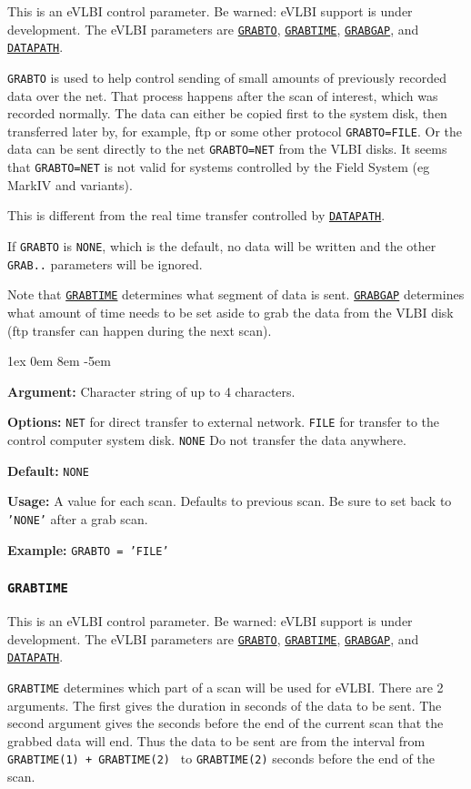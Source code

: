 \documentclass{report}
\newcommand{\rcwbox}[5]{
  \begin{list}{}{\parsep 1ex  \itemsep 0em
                 \leftmargin 8em  \itemindent -5em }
    \item {\bf Argument:} #1
    \item {\bf Options:}  #2
    \item {\bf Default:}  #3
    \item {\bf Usage:}    #4
    \item {\bf Example:}  #5
  \end{list}
}
\begin{document}
This is an eVLBI control parameter.  Be warned: eVLBI support is
under development.
The eVLBI parameters are 
{\hyperref[MP:GRABTO]{{\tt GRABTO}}},
{\hyperref[MP:GRABTIME]{{\tt GRABTIME}}}, 
{\hyperref[MP:GRABGAP]{{\tt GRABGAP}}},
and 
{\hyperref[MP:DATAPATH]{{\tt DATAPATH}}}.

{\tt GRABTO} is used to help control sending of small amounts of
previously recorded data over the net.  That process happens after the
scan of interest, which was recorded normally.  The data can either be
copied first to the system disk, then transferred later by, for
example, ftp or some other protocol {\tt GRABTO=FILE}.  Or the data
can be sent directly to the net {\tt GRABTO=NET} from the VLBI disks.
It seems that {\tt GRABTO=NET} is not valid for systems controlled by
the Field System (eg MarkIV and variants).

This is different from the real time transfer controlled by
{\hyperref[MP:DATAPATH]{{\tt DATAPATH}}}.

If {\tt GRABTO} is {\tt NONE}, which is the default, no data will be
written and the other {\tt GRAB..} parameters will be ignored.

Note that 
{\hyperref[MP:GRABTIME]{{\tt GRABTIME}}} determines what
segment of data is sent.  
{\hyperref[MP:GRABGAP]{{\tt GRABGAP}}} determines
what amount of time needs to be set aside to grab the data from the
VLBI disk (ftp transfer can happen during the next scan).

\rcwbox
{ Character string of up to 4 characters.}
{{\tt NET} for direct transfer to external network.
 {\tt FILE} for transfer to the control computer system disk.
 {\tt NONE} Do not transfer the data anywhere.}
{{\tt NONE}}
{A value for each scan.  Defaults to previous scan.  Be sure to set
back to {\tt 'NONE'} after a grab scan.}
{{\tt GRABTO = 'FILE' }}

\subsubsection{\label{MP:GRABTIME}{\tt GRABTIME}}

This is an eVLBI control parameter.  Be warned: eVLBI support is
under development.
The eVLBI parameters are 
{\hyperref[MP:GRABTO]{{\tt GRABTO}}},
{\hyperref[MP:GRABTIME]{{\tt GRABTIME}}}, 
{\hyperref[MP:GRABGAP]{{\tt GRABGAP}}},
and 
{\hyperref[MP:DATAPATH]{{\tt DATAPATH}}}.

{\tt GRABTIME} determines which part of a scan will be used for
eVLBI.  There are 2 arguments.  The first gives the duration in
seconds of the data to be sent.  The second argument gives the
seconds before the end of the current scan that the grabbed data
will end.  Thus the data to be sent are from the interval from
{\tt GRABTIME(1) + GRABTIME(2) } to {\tt GRABTIME(2)} seconds
before the end of the scan.
\end{document}
